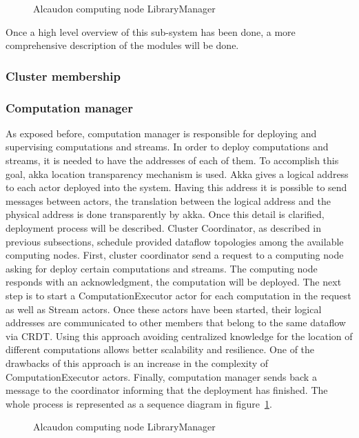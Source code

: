 \begin{figure}[!h]
  \centering
  \scalebox{0.45}{
    
  }
  \caption{Alcaudon computing node LibraryManager}
  \label{fig:librarymanagement}
\end{figure}

Once a high level overview of this sub-system has been done, a more
comprehensive description of the modules will be done.

\subsubsection{Cluster membership}
\lipsum
\subsubsection{Computation manager}

As exposed before, computation manager is responsible for deploying and
supervising computations and streams. In order to deploy computations and
streams, it is needed to have the addresses of each of them. To accomplish this
goal, akka location transparency mechanism is used. Akka gives a logical address
to each actor deployed into the system. Having this address it is possible to
send messages between actors, the translation between the logical address and
the physical address is done transparently by akka. Once this detail is
clarified, deployment process will be described. Cluster Coordinator, as
described in previous subsections, schedule provided dataflow topologies among
the available computing nodes. First, cluster coordinator send a request to a
computing node asking for deploy certain computations and streams. The computing
node responds with an acknowledgment, the computation will be deployed. The next
step is to start a ComputationExecutor actor for each computation in the request
as well as Stream actors. Once these actors have been started, their logical
addresses are communicated to other members that belong to the same dataflow via
\acs{CRDT}. Using this approach avoiding centralized knowledge for the location
of different computations allows better scalability and resilience. One of the
drawbacks of this approach is an increase in the complexity of ComputationExecutor
actors. Finally, computation manager sends back a message to the coordinator
informing that the deployment has finished. The whole process is represented as
a sequence diagram in figure~\ref{fig:librarymanagement}.

\begin{figure}[!h]
  \centering
  \scalebox{0.45}{
    
  }
  \caption{Alcaudon computing node LibraryManager}
  \label{fig:deployment}
\end{figure}

